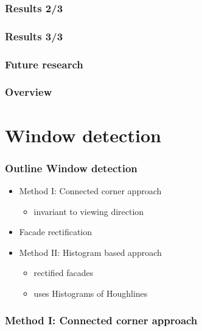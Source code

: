 \documentclass{beamer}
\begin{document}
\frame
{
	\frametitle{Results 2/3}
}


\frame
{
	\frametitle{Results 3/3}
}

\frame
{
	\frametitle{Future research}

}


\frame
{
	\frametitle{Overview}
}


\section{Window detection}


\frame
{
	\frametitle{Outline Window detection}
	\begin{itemize}
	\item <+-| alert@+> Method I: Connected corner approach 
		\begin{itemize}
		\item <+-| alert@+> invariant to viewing direction
		\end{itemize}
	\item <+-| alert@+> Facade rectification 
	\item <+-| alert@+> Method II: Histogram based approach
		\begin{itemize}
		\item <+-| alert@+> rectified facades 
		\item <+-| alert@+> uses Histograms of Houghlines
		\end{itemize}
	\end{itemize}
}

\frame
{
	\frametitle{Method I: Connected corner approach}
}
\end{document}
